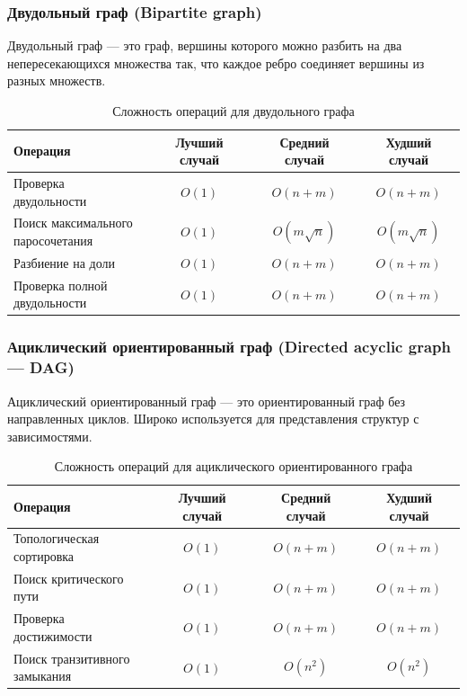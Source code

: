 \documentclass[a4paper,12pt]{article}
\begin{document}
\subsubsection{Двудольный граф (Bipartite graph)}
\label{subsubsec:двудольный-граф-bipartite-graph}

Двудольный граф --- это граф, вершины которого можно разбить на два непересекающихся множества так, что каждое ребро соединяет вершины из разных множеств.

\begin{table}[H]
    \centering
    \begin{tabular}{|l|c|c|c|}
        \hline
        Операция & Лучший случай & Средний случай & Худший случай \\
        \hline
        Проверка двудольности & $O(1)$ & $O(n + m)$ & $O(n + m)$ \\
        \hline
        \makecell[l]{Поиск максимального \\паросочетания} & $O(1)$ & $O(m \sqrt{n})$ & $O(m \sqrt{n})$ \\
        \hline
        Разбиение на доли & $O(1)$ & $O(n + m)$ & $O(n + m)$ \\
        \hline
        \makecell[l]{Проверка полной \\двудольности} & $O(1)$ & $O(n + m)$ & $O(n + m)$ \\
        \hline
    \end{tabular}
    \caption{Сложность операций для двудольного графа}
\end{table}

\subsubsection{Ациклический ориентированный граф (Directed acyclic graph --- DAG)}
\label{subsubsec:ациклический-ориентированный-граф-directed-acyclic-graph-dag}

Ациклический ориентированный граф --- это ориентированный граф без направленных циклов. Широко используется для представления структур с зависимостями.

\begin{table}[H]
    \centering
    \begin{tabular}{|l|c|c|c|}
        \hline
        Операция & Лучший случай & Средний случай & Худший случай \\
        \hline
        \makecell[l]{Топологическая \\сортировка} & $O(1)$ & $O(n + m)$ & $O(n + m)$ \\
        \hline
        \makecell[l]{Поиск критического \\пути} & $O(1)$ & $O(n + m)$ & $O(n + m)$ \\
        \hline
        Проверка достижимости & $O(1)$ & $O(n + m)$ & $O(n + m)$ \\
        \hline
        \makecell[l]{Поиск транзитивного \\замыкания} & $O(1)$ & $O(n^2)$ & $O(n^2)$ \\
        \hline
    \end{tabular}
    \caption{Сложность операций для ациклического ориентированного графа}
\end{table}
\end{document}
